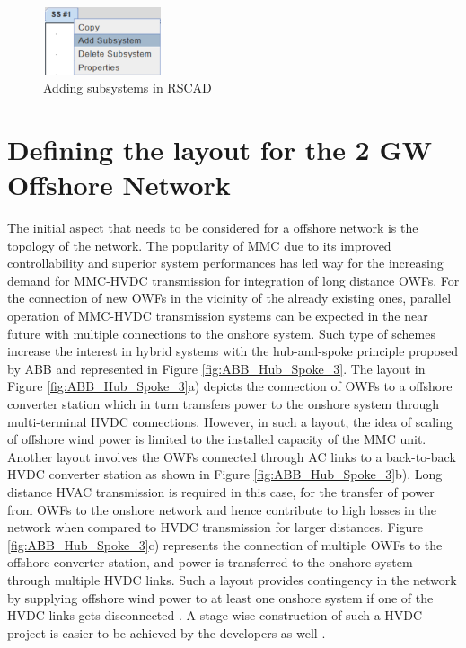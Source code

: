 \begin{figure}[H]
\centering
    \includegraphics[height = 2cm,width = 3.5cm]{Diagrams/Chapter_3/Subsystem.PNG}
    \caption{Adding subsystems in RSCAD}
    \label{fig:subsystem_RSCAD}
\end{figure}


\section{Defining the layout for the 2 GW Offshore Network}
The initial aspect that needs to be considered for a offshore network is the topology of the network. The popularity of \gls{MMC} due to its improved controllability and superior system performances has led way for the increasing demand for \gls{MMC}-\gls{HVDC} transmission for integration of long distance \gls{OWF}s. For the connection of new \gls{OWF}s in the vicinity of the already existing ones, parallel operation of \gls{MMC}-\gls{HVDC} transmission systems can be expected in the near future with multiple connections to the onshore system. Such type of schemes increase the interest in hybrid systems with the hub-and-spoke principle proposed by ABB \cite{abb_hvdc_2018} and represented in Figure \ref{fig:ABB_Hub_Spoke_3}. The layout in Figure \ref{fig:ABB_Hub_Spoke_3}a) depicts the connection of \gls{OWF}s to a offshore converter station which in turn transfers power to the onshore system through multi-terminal \gls{HVDC} connections. However, in such a layout, the idea of scaling of offshore wind power is limited to the installed capacity of the \gls{MMC} unit. Another layout involves the \gls{OWF}s connected through \gls{AC} links to a back-to-back \gls{HVDC} converter station as shown in Figure \ref{fig:ABB_Hub_Spoke_3}b). Long distance \gls{HVAC} transmission is required in this case, for the transfer of power from \gls{OWF}s to the onshore network and hence contribute to high losses in the network when compared to \gls{HVDC} transmission for larger distances. Figure \ref{fig:ABB_Hub_Spoke_3}c) represents the connection of multiple \gls{OWF}s to the offshore converter station, and power is transferred to the onshore system through multiple \gls{HVDC} links. Such a layout provides contingency in the network by supplying offshore wind power to at least one onshore system if one of the \gls{HVDC} links gets disconnected \cite{lescale2012parallelling}. A stage-wise construction of such a \gls{HVDC} project is easier to be achieved by the developers as well \cite{cigre_B455}.


